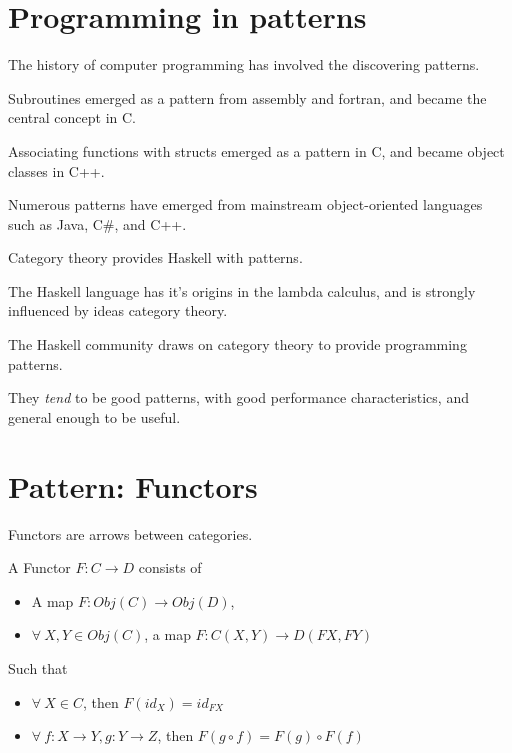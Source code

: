 \documentclass[xcolor={table}]{beamer}
\begin{document}
\section{Programming in patterns}

\begin{frame}{}{}

    {\Large The history of computer programming has involved the discovering patterns.}

    \pause\bigskip
    Subroutines emerged as a pattern from assembly and fortran, and became the central concept in C. 

    \pause\bigskip
    Associating functions with structs emerged as a pattern in C, and became object classes in C++.  

    \pause\bigskip
    Numerous patterns have emerged from mainstream object-oriented languages such as Java, C\#, and C++.

\end{frame}

\begin{frame}{}{}

    {\Large Category theory provides Haskell with patterns.}

    \pause\bigskip
    The Haskell language has it's origins in the lambda calculus, and is strongly influenced by ideas category theory.

    \pause\bigskip
    The Haskell community draws on category theory to provide programming patterns.

    \pause\bigskip
    They \emph{tend} to be good patterns, with good performance characteristics, and general enough to be useful.

\end{frame}

\section{Pattern: Functors}

\begin{frame}{}{}

    {\Large Functors are arrows between categories.}

    \pause\bigskip
    \begin{definition}
        A Functor $F : C \to D$ consists of
        \begin{itemize}
            \item A map $F: Obj(C) \to Obj(D)$,
            \item $\forall\ X,Y\in Obj(C)$, a map $F: C(X,Y) \to D(FX, FY)$
        \end{itemize}
        Such that
        \begin{itemize}
            \item $\forall\ X\in C$, then $ F(id_X) = id_{FX} $
            \item $\forall\ f:X\to Y, g:Y\to Z$, then $ F(g \circ f) = F(g) \circ F(f) $
        \end{itemize}
    \end{definition}

\end{frame}
\end{document}
